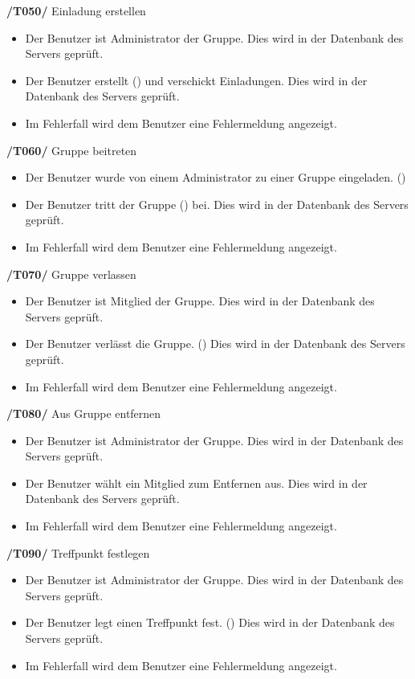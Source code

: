\textbf{/T050/} Einladung erstellen \\
\begin{itemize}
\setlength{\itemsep}{0pt}
\item Der Benutzer ist Administrator der Gruppe. Dies wird in der Datenbank des Servers geprüft.
\item Der Benutzer erstellt () und verschickt Einladungen. Dies wird in der Datenbank des Servers geprüft.
\item Im Fehlerfall wird dem Benutzer eine Fehlermeldung angezeigt.
\end{itemize}


\textbf{/T060/} Gruppe beitreten \\
\begin{itemize}
\setlength{\itemsep}{0pt}
\item Der Benutzer wurde von einem Administrator zu einer Gruppe eingeladen. ()
\item Der Benutzer tritt der Gruppe () bei. Dies wird in der Datenbank des Servers geprüft.
\item Im Fehlerfall wird dem Benutzer eine Fehlermeldung angezeigt.
\end{itemize}


\textbf{/T070/} Gruppe verlassen \\
\begin{itemize}
\setlength{\itemsep}{0pt}
\item Der Benutzer ist Mitglied der Gruppe. Dies wird in der Datenbank des Servers geprüft.
\item Der Benutzer verlässt die Gruppe. () Dies wird in der Datenbank des Servers geprüft.
\item Im Fehlerfall wird dem Benutzer eine Fehlermeldung angezeigt.
\end{itemize}


\textbf{/T080/} Aus Gruppe entfernen \\
\begin{itemize}
\setlength{\itemsep}{0pt}
\item Der Benutzer ist Administrator der Gruppe. Dies wird in der Datenbank des Servers geprüft.
\item Der Benutzer wählt ein Mitglied zum Entfernen aus. Dies wird in der Datenbank des Servers geprüft.
\item Im Fehlerfall wird dem Benutzer eine Fehlermeldung angezeigt.
\end{itemize}


\textbf{/T090/} Treffpunkt festlegen \\
\begin{itemize}
\setlength{\itemsep}{0pt}
\item Der Benutzer ist Administrator der Gruppe. Dies wird in der Datenbank des Servers geprüft.
\item Der Benutzer legt einen Treffpunkt fest. () Dies wird in der Datenbank des Servers geprüft.
\item Im Fehlerfall wird dem Benutzer eine Fehlermeldung angezeigt.
\end{itemize}


